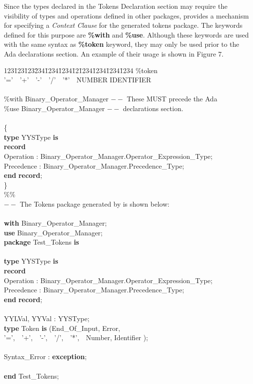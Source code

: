 Since the types declared in the Tokens Declaration section may require the
visibility of types and operations defined in other packages, \ayacc provides
a mechanism for specifying a {\it Context Clause} for the generated tokens
package.  The keywords defined for this purpose are {\bf \%with} and
{\bf \%use}.  Although these keywords are used with the same syntax as
{\bf \%token} keyword, they may only be used prior to the Ada declarations
section.  An example of their usage is shown in Figure 7.
\newpage
\noindent\hspace{-0.05in}\hrulefill\hspace{0.0in}\\
\vspace{-0.2in}
\begin{tabbing}
123\=123\=123\=234\=1234\=1234\=12\=1234\=1234\=1234\=1234 \kill
\%token  '='\ \ '+'\ \ '-'\ \ '/'\ \ '*'\ \ NUMBER  IDENTIFIER\\
\\
\%with	  Binary\_Operator\_Manager	  $--$ These MUST precede the Ada\\
\%use	  Binary\_Operator\_Manager	  $--$ declarations section.\\
\\
\{\\
\>  {\bf type} YYSType {\bf is}\\
\>\>    {\bf record}\\
\>\>\>      Operation  : Binary\_Operator\_Manager.Operator\_Expression\_Type;\\
\>\>\>      Precedence : Binary\_Operator\_Manager.Precedence\_Type;\\
\>    {\bf end} {\bf record};\\
\}\\
\%\%\\
$--$ The Tokens package generated by \ayacc is shown below:\\
\\
{\bf with}  Binary\_Operator\_Manager;\\
{\bf use}   Binary\_Operator\_Manager;\\
{\bf package} Test\_Tokens {\bf is}\\
\\
\>  {\bf type} YYSType {\bf is}\\
\>\>    {\bf record}\\
\>\>\>      Operation  : Binary\_Operator\_Manager.Operator\_Expression\_Type;\\
\>\>\>      Precedence : Binary\_Operator\_Manager.Precedence\_Type;\\
\>\>    {\bf end} {\bf record};\\
\\
\>\>    YYLVal, YYVal : YYSType;\\
\>\>    {\bf type} Token {\bf is} (\>\>\>\>End\_Of\_Input, Error,\\
\>\>\>\>\>\>                   '=',\ \ '+',\ \ '-',\ \ '/',\ \ '*',\ \ Number, Identifier );\\
\\
\>\>    Syntax\_Error : {\bf exception};\\
\\
{\bf end} Test\_Tokens;\\
\end{tabbing}
